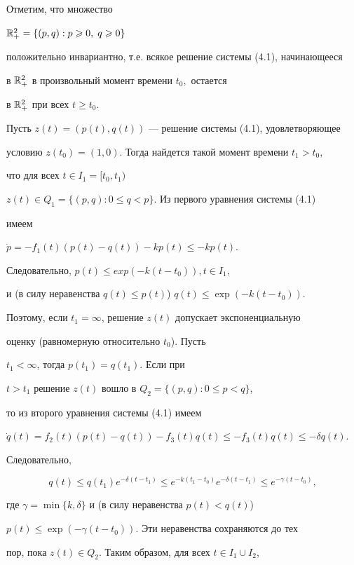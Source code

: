\begin{pf} Отметим, что множество


$\Bbb R_{+}^2=\{(p,q) : p\ge 0, \; q\ge 0\}$


положительно инвариантно, т.е. всякое решение системы (4.1), начинающееся


в $\Bbb R_{+}^2$ в произвольный момент времени $t_0,$ остается


в $\Bbb R_{+}^2$ при всех $t\ge t_0.$





Пусть $z(t)=(p(t),q(t))$ --- решение системы (4.1), удовлетворяющее


условию $z(t_0)=(1,0)$. Тогда найдется такой момент времени $t_1 > t_0$,


что для всех $t\in I_1 = [t_0,t_1)$\;\; 


$z(t) \in Q_1 =\{(p,q) : 0\le q < p\}$. Из первого уравнения системы (4.1)


имеем


$\Dot p = -f_1(t)(p(t)-q(t)) - kp(t) \le -kp(t)$.


Следовательно, $p(t)\le exp(-k(t-t_0)),t\in I_1$,


и (в силу неравенства $q(t)\le p(t)$)\;\; $q(t)\le\exp(-k(t-t_0))$.


Поэтому, если $t_1=\infty$, решение $z(t)$ допускает экспоненциальную


оценку (равномерную относительно $t_0$). Пусть


$t_1 < \infty$,  тогда $p(t_1) = q(t_1)$. Если при


$t > t_1$ решение $z(t)$ вошло в $Q_2 = \{(p,q): 0\le p < q\}$,


то из второго уравнения системы (4.1) имеем


$\Dot q(t) = f_2(t)(p(t) - q(t)) - f_3(t)q(t) \le -f_3(t)q(t) \le


-\delta q(t)$.


Следовательно,


$$


q(t)\le q(t_1)e^{-\delta (t-t_1)} \le e^{-k(t_1-t_0)}e^{-\delta (t-t_1)}\le


e^{-\gamma(t-t_0)},


$$


где $\gamma=\min\{k,\delta\}$ и (в силу неравенства $p(t)<q(t)$)\;\;


$p(t)\le\exp(-\gamma(t-t_0))$. Эти неравенства сохраняются до тех


пор, пока $z(t)\in Q_2.$ Таким образом, для всех $t \in I_1 \cup I_2$,



\end{pf}
